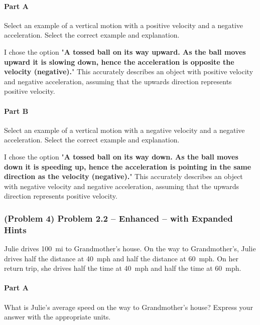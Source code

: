 \paragraph{Part A}
Select an example of a vertical motion with a positive velocity and a negative acceleration. Select the correct example and explanation.

\begin{solution}
	I chose the option "\textbf{A tossed ball on its way upward. As the ball moves upward it is slowing down, hence the acceleration is opposite the velocity (negative).}" This accurately describes an object with positive velocity and negative acceleration, assuming that the upwards direction represents positive velocity.
\end{solution}

\paragraph{Part B}
Select an example of a vertical motion with a negative velocity and a negative acceleration. Select the correct example and explanation.

\begin{solution}
	I chose the option "\textbf{A tossed ball on its way down. As the ball moves down it is speeding up, hence the acceleration is pointing in the same direction as the velocity (negative).}" This accurately describes an object with negative velocity and negative acceleration, assuming that the upwards direction represents positive velocity.
\end{solution}

\newpage

\subsubsection{(Problem 4) Problem 2.2 -- Enhanced -- with Expanded Hints}
Julie drives \SI{100}{mi} to Grandmother's house. On the way to Grandmother's, Julie drives half the distance at \SI{40}{mph} and half the distance at \SI{60}{mph}. On her return trip, she drives half the time at \SI{40}{mph} and half the time at \SI{60}{mph}.

\paragraph{Part A}
What is Julie's average speed on the way to Grandmother's house?
Express your answer with the appropriate units.

